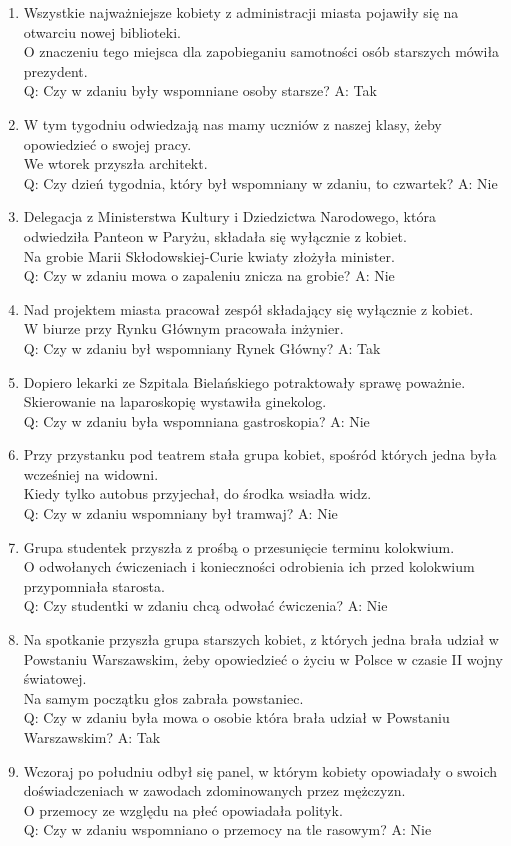 \begin{enumerate}
\item Wszystkie najważniejsze kobiety z administracji miasta pojawiły się na otwarciu nowej biblioteki.\\
	O znaczeniu tego miejsca dla zapobieganiu samotności osób starszych mówiła prezydent.\\
	Q: Czy w zdaniu były wspomniane osoby starsze? A: Tak
\item W tym tygodniu odwiedzają nas mamy uczniów z naszej klasy, żeby opowiedzieć o swojej pracy.\\
	We wtorek przyszła architekt.\\
	Q: Czy dzień tygodnia, który był wspomniany w zdaniu, to czwartek? A: Nie
\item Delegacja z Ministerstwa Kultury i Dziedzictwa Narodowego, która odwiedziła Panteon w Paryżu, składała się wyłącznie z kobiet.\\
	Na grobie Marii Skłodowskiej-Curie kwiaty złożyła minister.\\
	Q: Czy w zdaniu mowa o zapaleniu znicza na grobie? A: Nie
\item Nad projektem miasta pracował zespół składający się wyłącznie z kobiet.\\
	W biurze przy Rynku Głównym pracowała inżynier.\\
	Q: Czy w zdaniu był wspomniany Rynek Główny? A: Tak
\item Dopiero lekarki ze Szpitala Bielańskiego potraktowały sprawę poważnie.\\
	Skierowanie na laparoskopię wystawiła ginekolog.\\
	Q: Czy w zdaniu była wspomniana gastroskopia? A: Nie
\item Przy przystanku pod teatrem stała grupa kobiet, spośród których jedna była wcześniej na widowni.\\
	Kiedy tylko autobus przyjechał, do środka wsiadła widz.\\
	Q: Czy w zdaniu wspomniany był tramwaj? A: Nie
\item Grupa studentek przyszła z prośbą o przesunięcie terminu kolokwium.\\
	O odwołanych ćwiczeniach i konieczności odrobienia ich przed kolokwium przypomniała starosta.\\
	Q: Czy studentki w zdaniu chcą odwołać ćwiczenia? A: Nie
\item Na spotkanie przyszła grupa starszych kobiet, z których jedna brała udział w Powstaniu Warszawskim, żeby opowiedzieć o życiu w Polsce w czasie II wojny światowej. \\
	Na samym początku głos zabrała powstaniec.\\
	Q: Czy w zdaniu była mowa o osobie która brała udział w Powstaniu Warszawskim? A: Tak
\item Wczoraj po południu odbył się panel, w którym kobiety opowiadały o swoich doświadczeniach w zawodach zdominowanych przez mężczyzn.\\
	O przemocy ze względu na płeć opowiadała polityk.\\
	Q: Czy w zdaniu wspomniano o przemocy na tle rasowym? A: Nie
\end{enumerate}

